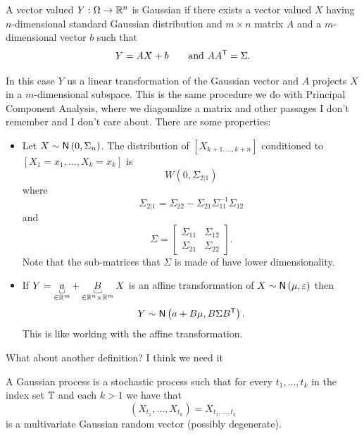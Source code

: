 \documentclass{report}
\begin{document}
\begin{definition}
	A vector valued \rv $Y:\Omega\to\mathbb{R}^{n}$ is Gaussian if there exists a vector valued $X$ having $n$-dimensional standard Gaussian distribution and $m\times n$ matrix $A$ and a $m$-dimensional vector $b$ such that
	\begin{equation*}
		Y=AX+b\qquad\text{and }AA^{\mathsf{T}}=\Sigma.
	\end{equation*}
\end{definition}
In this case $Y$ us a linear transformation of the Gaussian vector and $A$ projects $X$ in a $m$-dimensional subspace. This is the same procedure we do with Principal Component Analysis, where we diagonalize a matrix and other passages I don't remember and I don't care about.
There are some properties:
\begin{proposition}
	\begin{itemize}
		\item Let $X\sim\mathsf{N}\left(0,\Sigma_{n}\right)$. The distribution of $\left[X_{k+1,\ldots,k+n}\right]$ conditioned to $\left[X_{1}=x_{1},\ldots,X_{k}=x_{k}\right]$ is \begin{equation*}
		W(0,\Sigma_{2|1})
		\end{equation*}
		where 
		\begin{equation*}
			\Sigma_{2|1}=\Sigma_{22}-\Sigma_{21}\Sigma_{11}^{-1}\Sigma_{12}
		\end{equation*}
		and 
		\begin{equation*}
			\Sigma=\begin{bmatrix}
				\Sigma_{11}&\Sigma_{12}\\
				\Sigma_{21}&\Sigma_{22}
			\end{bmatrix}.
		\end{equation*}
		Note that the sub-matrices that $\Sigma$ is made of have lower dimensionality.
		\item If $Y=\ubracketthin{a}_{\in\R^{m}}+\ubracketthin{B}_{\in\R^{n}\times\R^{m}}X$ is an affine transformation of $X\sim\mathsf{N}\left(\mu,\varepsilon\right)$ then $$Y\sim\mathsf{N}\left(a+B\mu, B\Sigma B^{\mathsf{T}}\right).$$
		This is like working with the affine transformation.
	\end{itemize}
\end{proposition}
What about another definition? I think we need it
\begin{definition}
	A Gaussian process is a stochastic process such that for every $t_{1},\ldots,t_{k}$ in the index set $\mathbb{T}$ and each $k>1$ we have that
	\begin{equation*}
		\left(X_{t_{1}},\ldots,X_{t_{k}}\right)=X_{t_{1},\ldots,t_{k}}
	\end{equation*}
	is a multivariate Gaussian random vector (possibly degenerate).
\end{definition}
\end{document}
